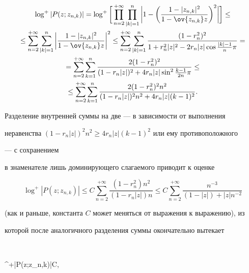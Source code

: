 \begin{multline*} 


\log^+|P(z;z_{n,k})|=\log^+\bigg[ 


\prod^{+\infty}_{n=2}\prod^n_{|k|=1}\bigg|1-\bigg( 


\frac{1-|z_{n,k}|^2}{1-\ov{z_{n,k}}z}\bigg)^2\bigg|\bigg]\le \\ 


% 


\le\sum^{+\infty}_{n=2}\sum^n_{|k|=1}\bigg| 


\frac{1-|z_{n,k}|^2}{1-\ov{z_{n,k}}z}\bigg|^2\le 


\sum^{+\infty}_{n=2}\sum^n_{|k|=1} 


\frac{(1-r^2_n)^2} 


{1+r^2_n|z|^2-2r_n|z|\cos\frac{|k|-1}{n}\pi}=\\ 


% 


=\sum^{+\infty}_{n=2}\sum^n_{k=1}\frac{2(1-r^2_n)^2} 


{(1-r_n|z|)^2+4r_n|z|\sin^2\frac{k-1}{2n}\pi}\le \\ 


% 


\le\sum^{+\infty}_{n=2}\sum^n_{k=1}\frac{2(1-r^2_n)^2n^2} 


{(1-r_n|z|)^2n^2+4r_n|z|(k-1)^2}. 


\end{multline*} 


Разделение внутренней суммы на две --- в зависимости от выполнения 


неравенства $(1-r_n|z|)^2n^2\ge 4r_n|z|(k-1)^2$ или ему противоположного 


--- с сохранением 


в знаменателе лишь доминирующего слагаемого приводит к оценке 


$$ 


\log^+|P(z;z_{n,k})|\le C\sum^{+\infty}_{n=2} 


\frac{(1-r^2_n)n^2}{(1-r_n|z|)n}\le C 


\sum^{+\infty}_{n=2}\frac{n^{-3}}{(1-|z|)+|z|n^{-2}} 


$$ 


(как и раньше, константа $C$ может меняться от выражения к выражению), из 


которой после аналогичного разделения суммы окончательно вытекает 


$$ 


\log^+|P(z;z_{n,k})|\le C\log{},\quad 


